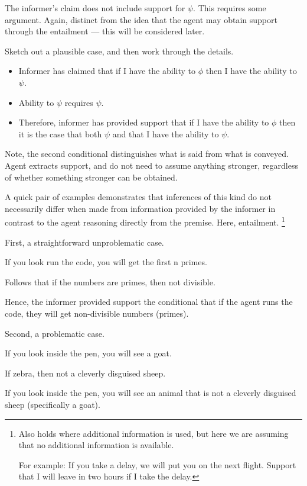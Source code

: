 \documentclass[10pt]{article}
\newcommand{\hozlinedash}[0]{%
  \noindent\hdashrule[0.5ex][c]{\textwidth}{.1pt}{2.5pt}
}
\begin{document}
\hozlinedash

The informer's claim does not include support for \(\psi\).
This requires some argument.
Again, distinct from the idea that the agent may obtain support through the entailment --- this will be considered later.

Sketch out a plausible case, and then work through the details.


\begin{itemize}
\item Informer has claimed that if I have the ability to \(\phi\) then I have the ability to \(\psi\).
\item Ability to \(\psi\) requires \(\psi\).
\item Therefore, informer has provided support that if I have the ability to \(\phi\) then it is the case that both \(\psi\) and that I have the ability to \(\psi\).
\end{itemize}

Note, the second conditional distinguishes what is said from what is conveyed.
Agent extracts support, and do not need to assume anything stronger, regardless of whether something stronger can be obtained.

A quick pair of examples demonstrates that inferences of this kind do not necessarily differ when made from information provided by the informer in contrast to the agent reasoning directly from the premise.
Here, entailment.\nolinebreak
\footnote{
  Also holds where additional information is used, but here we are assuming that no additional information is available.

  For example:
  If you take a delay, we will put you on the next flight.
  Support that I will leave in two hours if I take the delay.
}


First, a straightforward unproblematic case.

If you look run the code, you will get the first n primes.

Follows that if the numbers are primes, then not divisible.

Hence, the informer provided support the conditional that if the agent runs the code, they will get non-divisible numbers (primes).

Second, a problematic case.

If you look inside the pen, you will see a goat.

If zebra, then not a cleverly disguised sheep.

If you look inside the pen, you will see an animal that is not a cleverly disguised sheep (specifically a goat).
\end{document}
